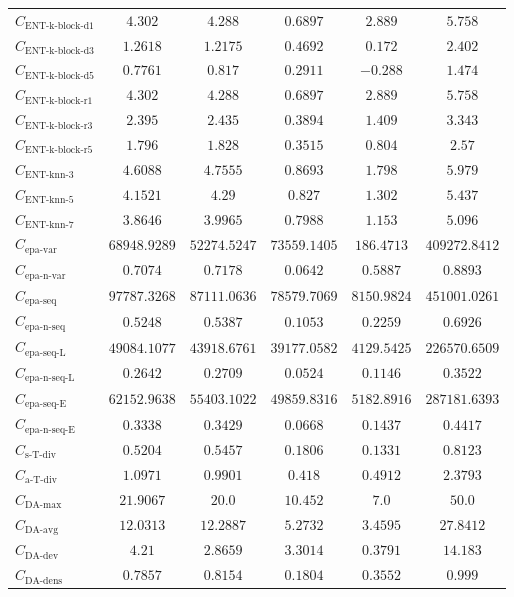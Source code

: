 \documentclass{standalone}
\newcommand{\daavgname}{\text{DA-avg}}
\newcommand{\daavg}{C_{\daavgname}}
\newcommand{\damaxname}{\text{DA-max}}
\newcommand{\damax}{C_{\damaxname}}
\newcommand{\dadevname}{\text{DA-dev}}
\newcommand{\dadev}{C_{\dadevname}}
\newcommand{\dadensname}{\text{DA-dens}}
\newcommand{\dadens}{C_{\dadensname}}
\newcommand{\simpletracedivname}{\text{s-T-div}}
\newcommand{\simpletracediv}{C_{\simpletracedivname}}
\newcommand{\advtracedivname}{\text{a-T-div}}
\newcommand{\advtracediv}{C_{\advtracedivname}}
\newcommand{\entkblockdonename}{\text{ENT-k-block-d1}}
\newcommand{\entkblockdone}{C_{\entkblockdonename}}
\newcommand{\entkblockdthreename}{\text{ENT-k-block-d3}}
\newcommand{\entkblockdthree}{C_{\entkblockdthreename}}
\newcommand{\entkblockdfivename}{\text{ENT-k-block-d5}}
\newcommand{\entkblockdfive}{C_{\entkblockdfivename}}
\newcommand{\entkblockronename}{\text{ENT-k-block-r1}}
\newcommand{\entkblockrone}{C_{\entkblockronename}}
\newcommand{\entkblockrthreename}{\text{ENT-k-block-r3}}
\newcommand{\entkblockrthree}{C_{\entkblockrthreename}}
\newcommand{\entkblockrfivename}{\text{ENT-k-block-r5}}
\newcommand{\entkblockrfive}{C_{\entkblockrfivename}}
\newcommand{\entknnthreename}{\text{ENT-knn-3}}
\newcommand{\entknnthree}{C_{\entknnthreename}}
\newcommand{\entknnfivename}{\text{ENT-knn-5}}
\newcommand{\entknnfive}{C_{\entknnfivename}}
\newcommand{\entknnsevenname}{\text{ENT-knn-7}}
\newcommand{\entknnseven}{C_{\entknnsevenname}}
\newcommand{\epavariantname}{\text{epa-var}}
\newcommand{\epavariant}{C_{\epavariantname}}
\newcommand{\epanormvariantname}{\text{epa-n-var}}
\newcommand{\epanormvariant}{C_{\epanormvariantname}}
\newcommand{\epasequencename}{\text{epa-seq}}
\newcommand{\epasequence}{C_{\epasequencename}}
\newcommand{\epanormsequencename}{\text{epa-n-seq}}
\newcommand{\epanormsequence}{C_{\epanormsequencename}}
\newcommand{\epasequencelname}{\text{epa-seq-L}}
\newcommand{\epasequencel}{C_{\epasequencelname}}
\newcommand{\epanormsequencelname}{\text{epa-n-seq-L}}
\newcommand{\epanormsequencel}{C_{\epanormsequencelname}}
\newcommand{\epasequenceename}{\text{epa-seq-E}}
\newcommand{\epasequencee}{C_{\epasequenceename}}
\newcommand{\epanormsequenceename}{\text{epa-n-seq-E}}
\newcommand{\epanormsequencee}{C_{\epanormsequenceename}}
\begin{document}
\begin{tabular}{lccccc}
$\entkblockdone$ & $4.302$ & $4.288$ & $0.6897$ & $2.889$ & $5.758$ \\ 
$\entkblockdthree$ & $1.2618$ & $1.2175$ & $0.4692$ & $0.172$ & $2.402$ \\ 
$\entkblockdfive$ & $0.7761$ & $0.817$ & $0.2911$ & $-0.288$ & $1.474$ \\ 
$\entkblockrone$ & $4.302$ & $4.288$ & $0.6897$ & $2.889$ & $5.758$ \\ 
$\entkblockrthree$ & $2.395$ & $2.435$ & $0.3894$ & $1.409$ & $3.343$ \\ 
$\entkblockrfive$ & $1.796$ & $1.828$ & $0.3515$ & $0.804$ & $2.57$ \\ 
$\entknnthree$ & $4.6088$ & $4.7555$ & $0.8693$ & $1.798$ & $5.979$ \\ 
$\entknnfive$ & $4.1521$ & $4.29$ & $0.827$ & $1.302$ & $5.437$ \\ 
$\entknnseven$ & $3.8646$ & $3.9965$ & $0.7988$ & $1.153$ & $5.096$ \\ 
$\epavariant$ & $68948.9289$ & $52274.5247$ & $73559.1405$ & $186.4713$ & $409272.8412$ \\ 
$\epanormvariant$ & $0.7074$ & $0.7178$ & $0.0642$ & $0.5887$ & $0.8893$ \\ 
$\epasequence$ & $97787.3268$ & $87111.0636$ & $78579.7069$ & $8150.9824$ & $451001.0261$ \\ 
$\epanormsequence$ & $0.5248$ & $0.5387$ & $0.1053$ & $0.2259$ & $0.6926$ \\ 
$\epasequencel$ & $49084.1077$ & $43918.6761$ & $39177.0582$ & $4129.5425$ & $226570.6509$ \\ 
$\epanormsequencel$ & $0.2642$ & $0.2709$ & $0.0524$ & $0.1146$ & $0.3522$ \\ 
$\epasequencee$ & $62152.9638$ & $55403.1022$ & $49859.8316$ & $5182.8916$ & $287181.6393$ \\ 
$\epanormsequencee$ & $0.3338$ & $0.3429$ & $0.0668$ & $0.1437$ & $0.4417$ \\ 
$\simpletracediv$ & $0.5204$ & $0.5457$ & $0.1806$ & $0.1331$ & $0.8123$ \\ 
$\advtracediv$ & $1.0971$ & $0.9901$ & $0.418$ & $0.4912$ & $2.3793$ \\ 
$\damax$ & $21.9067$ & $20.0$ & $10.452$ & $7.0$ & $50.0$ \\ 
$\daavg$ & $12.0313$ & $12.2887$ & $5.2732$ & $3.4595$ & $27.8412$ \\ 
$\dadev$ & $4.21$ & $2.8659$ & $3.3014$ & $0.3791$ & $14.183$ \\ 
$\dadens$ & $0.7857$ & $0.8154$ & $0.1804$ & $0.3552$ & $0.999$ \\ 

\end{tabular}
\end{document}
